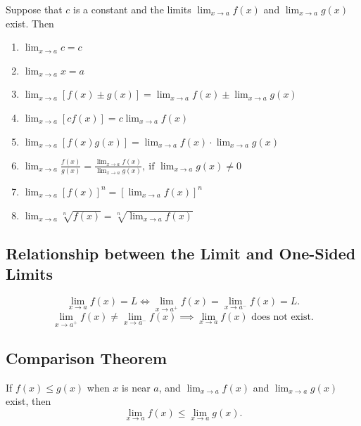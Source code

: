 \documentclass[a4paper,11pt]{article}
\begin{document}
\begin{tcolorbox}
    Suppose that $c$ is a constant and the limits $ \lim_{x \to a} f(x)$ and $ \lim_{x \to a} g(x)$ exist. Then
    \begin{enumerate}
        \item $\lim_{x \to a} c = c$
        \item $\lim_{x \to a} x = a$
        \item $\lim_{x \to a} [f(x) \pm g(x)] = \lim_{x \to a} f(x) \pm \lim_{x \to a} g(x)$
        \item $\lim_{x \to a} [c f(x)] = c \lim_{x \to a} f(x)$
        \item $\lim_{x \to a} [f(x) g(x)] = \lim_{x \to a} f(x) \cdot \lim_{x \to a} g(x)$
        \item $\lim_{x \to a} \frac{f(x)}{g(x)} = \frac{\displaystyle \lim_{x \to a} f(x)}{\lim_{x \to a} g(x)},\ \text{if } \lim_{x \to a} g(x) \neq 0$
        \item $\lim_{x \to a} [f(x)]^n = [\lim_{x \to a} f(x)]^n$
        \item $\lim_{x \to a} \sqrt[n]{f(x)} = \sqrt[n]{\lim_{x \to a} f(x)}$
    \end{enumerate}
\end{tcolorbox}




\subsection{Relationship between the Limit and One-Sided Limits}

\begin{tcolorbox}
    \[
    \lim_{x \to a} f(x) = L \iff \lim_{x \to a^+} f(x) = \lim_{x \to a^-} f(x) = L.
    \]
    \[
    \lim_{x \to a^+} f(x) \neq \lim_{x \to a^-} f(x) \implies \lim_{x \to a} f(x) \text{ does not exist}.
    \]
\end{tcolorbox}




\subsection{Comparison Theorem}

\begin{tcolorbox}
    If  $f(x) \leq g(x)$ when $x$ is near $a$, and $\lim_{x \to a} f(x)$ and $\lim_{x \to a} g(x)$ exist, then 
    \[
    \lim_{x \to a} f(x) \leq \lim_{x \to a} g(x).
    \]
\end{tcolorbox}
\end{document}
